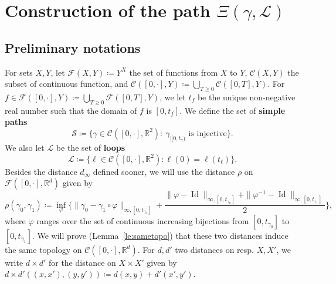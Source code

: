 \documentclass[11pt]{article}
\def\Att{{\Xi}}
\begin{document}
%
%




\section{Construction of the path \texorpdfstring{$\Att(\gamma,\mathcal{L})$}{Xi(gamma,L)}}
\label{sec:construction}


\subsection{Preliminary notations}
For sets $X,Y$, let $\mathcal{F}(X,Y)\coloneqq Y^X$ the set of functions from $X$ to $Y$, $\mathcal{C}(X, Y) $ the subset of continuous function, and $ \mathcal{C}( [0,\cdot],Y)\coloneqq  \bigcup_{T\geq 0} \mathcal{C}( [0,T], Y)$. For $f\in \mathcal{F}( [0,\cdot],Y)\coloneqq \bigcup_{T\geq 0} \mathcal{F}( [0,T], Y)$, we let $t_f$ be the unique non-negative real number such that the domain of $f$ is $[0,t_f]$.
We define the set of \textbf{simple paths }
\[ \mathscr{S}\coloneqq
\{\gamma\in \mathcal{C}([0,\cdot],\mathbb{R}^2):  \ \gamma_{|[0,t_\gamma)} \mbox{ is injective}\}.
\]
We also let $\mathscr{L}$ be the set of \textbf{loops}
\[
\mathscr{L} \coloneqq
\{\ell\in \mathcal{C}([0,\cdot],\mathbb{R}^2):  \ell(0)=\ell(t_\ell)\}.
\]
Besides the distance $d_\infty$ defined sooner, we will use the distance $\rho$ on $ \mathcal{F}( [0,\cdot], \mathbb{R}^d)$ given by
\[
\rho (\gamma_0, \gamma_1)\coloneqq \inf_\varphi \{\|{\gamma}_0-{\gamma}_1\circ \varphi\|_{\infty,[0,t_{\gamma_0}] }+\frac{\|\varphi-\operatorname{Id}\|_{\infty,[0,t_{\gamma_0}] }+\|\varphi^{-1}-\operatorname{Id}\|_{\infty,[0,t_{\gamma_1}] }}{2} \},%
\]
where $\varphi$ ranges over the set of continuous increasing bijections from $[0,t_{\gamma_0}]$  to $[0,t_{\gamma_1}]$.
We will prove (Lemma~\ref{le:sametopo}) that these two distances induce the same topology on $ \mathcal{C}( [0,\cdot], \mathbb{R}^d)$.
For $d,d'$ two distances on resp. $X,X'$, we write $d\times d'$ for the distance on $X\times X'$ given by $d\times d'((x,x'),(y,y'))\coloneqq d(x,y)+d'(x',y')$.
\end{document}
